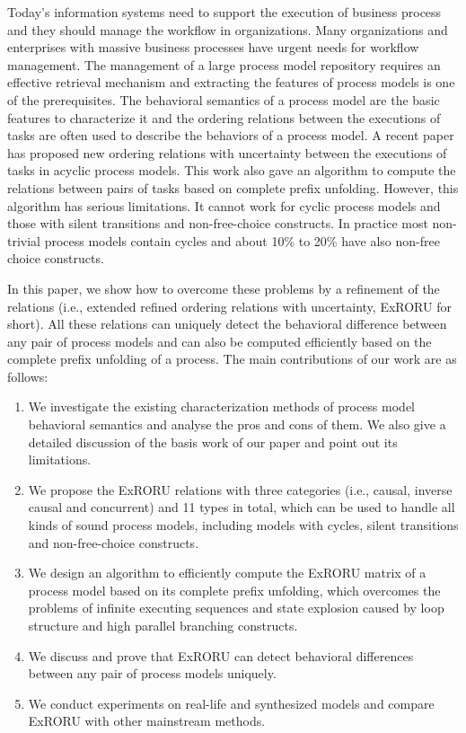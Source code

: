 \begin{eabstract}
Today's information systems need to support the execution of business process and they should manage the workflow in organizations. Many organizations and enterprises with massive business processes have urgent needs for workflow management. The management of a large process model repository requires an effective retrieval mechanism and extracting the features of process models is one of the prerequisites. The behavioral semantics of a process model are the basic features to characterize it and the ordering relations between the executions of tasks are often used to describe the behaviors of a  process model. A recent paper has proposed new ordering relations with uncertainty between the executions of tasks in acyclic process models. This work also gave an algorithm to compute the relations between pairs of tasks based on complete prefix unfolding. However, this algorithm has serious limitations. It cannot work for cyclic process models and those with silent transitions and non-free-choice constructs. In practice most non-trivial process models contain cycles and about 10\% to 20\% have also non-free choice constructs. 

In this paper, we show how to overcome these problems by a refinement of the relations (i.e., extended refined ordering relations with uncertainty, ExRORU for short). All these relations can uniquely detect the behavioral difference between any pair of process models and can also be computed efficiently based on the complete prefix unfolding of a process. The main contributions of our work are as follows:
\begin{enumerate}[1.]
  \item We investigate the existing characterization methods of process model behavioral semantics and analyse the pros and cons of them. We also give a detailed discussion of the basis work of our paper and point out its limitations.
  \item We propose the ExRORU relations with three categories (i.e., causal, inverse causal and concurrent) and 11 types in total, which can be used to handle all kinds of sound process models, including models with cycles, silent transitions and non-free-choice constructs.
  \item We design an algorithm to efficiently compute the ExRORU matrix of a process model based on its complete prefix unfolding, which overcomes the problems of infinite executing sequences and state explosion caused by loop structure and high parallel branching constructs.
  \item We discuss and prove that ExRORU can detect behavioral differences between any pair of process models uniquely.
  \item We conduct experiments on real-life and synthesized models and compare ExRORU with other mainstream methods.
\end{enumerate}
\end{eabstract}

